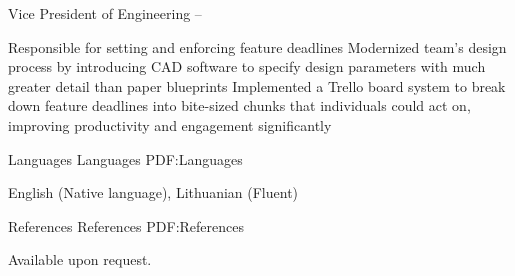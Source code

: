 \documentclass[letterpaper,MMMyyyy,nonstopmode]{simpleresumecv}
\newcommand{\CVNote}{Resume compiled on {\today}}
\begin{document}
\begin{Body}
\Gap
\BulletItem
Vice President of Engineering
\hfill
{} --
\begin{Detail}
\SubBulletItem
Responsible for setting and enforcing feature deadlines
\SubBulletItem
Modernized team's design process by introducing CAD software to specify design parameters with much greater detail than paper blueprints
\SubBulletItem
Implemented a Trello board system to break down feature deadlines into bite-sized chunks that individuals could act on, improving productivity and engagement significantly
\end{Detail}


\Section
{Languages}
{Languages}
{PDF:Languages}

\Entry
English (Native language), Lithuanian (Fluent)


\Section
{References}
{References}
{PDF:References}

\Entry
Available upon request.

\end{Body}


\end{document}
